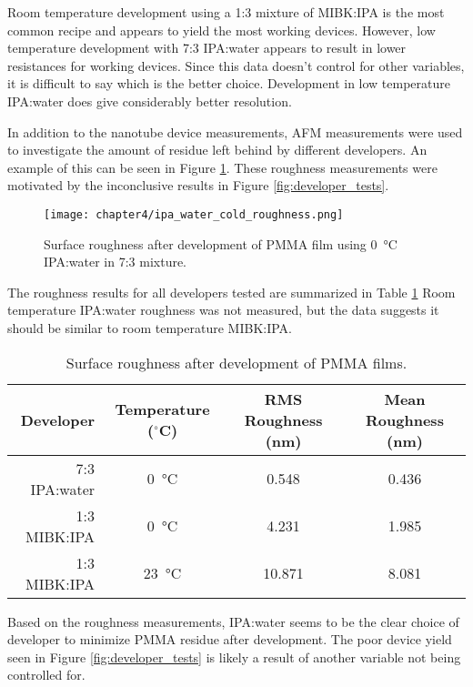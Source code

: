 Room temperature development using a 1:3 mixture of MIBK:IPA is the most common recipe and appears to yield the most working devices. However, low temperature development with 7:3 IPA:water appears to result in lower resistances for working devices. Since this data doesn't control for other variables, it is difficult to say which is the better choice. Development in low temperature IPA:water does give considerably better resolution. 

In addition to the nanotube device measurements, AFM measurements were used to investigate the amount of residue left behind by different developers. An example of this can be seen in Figure \ref{fig:roughness}. These roughness measurements were motivated by the inconclusive results in Figure \ref{fig:developer_tests}.

\begin{figure}
    \centering
    \texttt{[image: chapter4/ipa\_water\_cold\_roughness.png]}
    \caption{Surface roughness after development of PMMA film using \SI{0}{\celsius} IPA:water in 7:3 mixture.}
    \label{fig:roughness}
\end{figure}

The roughness results for all developers tested are summarized in Table \ref{table:surface_roughness} Room temperature IPA:water roughness was not measured, but the data suggests it should be similar to room temperature MIBK:IPA.

\begin{table}
    \centering
    \caption{Surface roughness after development of PMMA films.}
    \begin{tabular}{ r | c c c}
        Developer & Temperature ($^{\circ}$C) & RMS Roughness (nm) & Mean Roughness (nm) \\ \hline
    7:3 IPA:water & \SI{0}{\celsius} & 0.548 & 0.436 \\
    1:3 MIBK:IPA & \SI{0}{\celsius} & 4.231 & 1.985 \\
    1:3 MIBK:IPA & \SI{23}{\celsius} & 10.871 & 8.081 \\
    \end{tabular}
    \label{table:surface_roughness}  
\end{table}

Based on the roughness measurements, IPA:water seems to be the clear choice of developer to minimize PMMA residue after development. The poor device yield seen in Figure \ref{fig:developer_tests} is likely a result of another variable not being controlled for.

